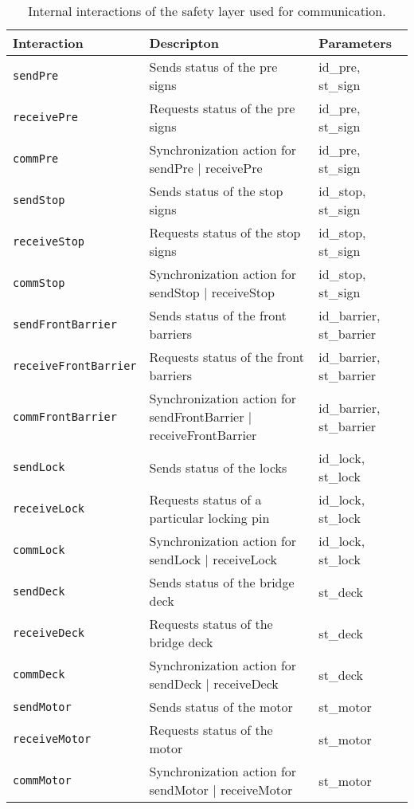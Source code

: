 \begin{table}[htb]%
\begin{tabular}{lll}
			\textbf{Interaction} &	\textbf{Descripton}	&	\textbf{Parameters}\\
      \hline
      
      \texttt{sendPre} & Sends status of the pre signs & id\_pre, st\_sign\\
      \texttt{receivePre} & Requests status of the pre signs & id\_pre, st\_sign\\
      \texttt{commPre} & Synchronization action for sendPre $\mid$ receivePre & id\_pre, st\_sign\\
      
      \texttt{sendStop} & Sends status of the stop signs & id\_stop, st\_sign\\
      \texttt{receiveStop} & Requests status of the stop signs & id\_stop, st\_sign\\
      \texttt{commStop} & Synchronization action for sendStop $\mid$ receiveStop & id\_stop, st\_sign\\
      
      \texttt{sendFrontBarrier} & Sends status of the front barriers & id\_barrier, st\_barrier\\
      \texttt{receiveFrontBarrier} & Requests status of the front barriers & id\_barrier, st\_barrier\\
      \texttt{commFrontBarrier} & Synchronization action for sendFrontBarrier $\mid$ receiveFrontBarrier & id\_barrier, st\_barrier\\
      
      \texttt{sendLock} & Sends status of the locks & id\_lock, st\_lock\\
      \texttt{receiveLock} & Requests status of a particular locking pin & id\_lock, st\_lock\\
      \texttt{commLock} & Synchronization action for sendLock $\mid$ receiveLock & id\_lock, st\_lock\\
      
      \texttt{sendDeck} & Sends status of the bridge deck & st\_deck\\
      \texttt{receiveDeck} & Requests status of the bridge deck & st\_deck\\
      \texttt{commDeck} & Synchronization action for sendDeck $\mid$ receiveDeck & st\_deck\\
      
      \texttt{sendMotor} & Sends status of the motor & st\_motor\\
      \texttt{receiveMotor} & Requests status of the motor & st\_motor\\
      \texttt{commMotor} & Synchronization action for sendMotor $\mid$ receiveMotor & st\_motor\\
\end{tabular}
\caption{Internal interactions of the safety layer used for communication.}
\label{tab:process}
\end{table}

